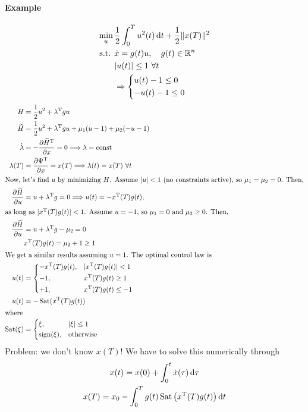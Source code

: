 \paragraph{Example} \mbox{}
\begin{align}
  \min_u {} & \frac12 \int_0^T u^2(t)\mathop{}\!\mathrm{d} t + \frac12 \Vert x(T)\Vert^2 \\
  \text{s.t. } & \dot x=g(t) u, \quad g(t)\in\mathbb{R}^n \\
            & |u(t)| \le 1 \ \forall t \\
            & \Rightarrow \begin{dcases}
              u(t) - 1 \le 0 \\
              -u(t) - 1 \le 0
            \end{dcases}
\end{align}
\begin{align}
  H &= \frac12 u^2 + \lambda^\text{T} gu \\
  \widetilde H &= \frac12 u^2 + \lambda^\text{T} gu + \mu_1(u-1) + \mu_2(-u-1) \\
  \dot\lambda &= -\frac{\partial \widetilde H^\text{T}}{\partial x} = 0 \Longrightarrow \lambda=\text{const} \\
  \lambda(T) &= \frac{\partial \Psi^\text{T}}{\partial x} = x(T) \Longrightarrow \lambda(t) = x(T) \ \forall t \\
               \shortintertext{Now, let's find $u$ by minimizing $H$. Assume $|u|<1$ (no constraints active), so $\mu_1=\mu_2=0$. Then,}
  \frac{\partial \widetilde H}{\partial u} &= u + \lambda^\text{T} g = 0 \Longrightarrow u(t) = -x^\text{T}(T) g(t), \\
  \shortintertext{as long as $|x^\text{T}(T)g(t)|<1$. Assume $u=-1$, so $\mu_1=0$ and $\mu_2\ge0$. Then,}
  \frac{\partial \widetilde H}{\partial u} &= u + \lambda^\text{T} g - \mu_2 = 0 \\
    & x^\text{T}(T) g(t) = \mu_2 + 1 \ge 1 \\
  \shortintertext{We get a similar results assuming $u=1$. The optimal control law is}
  u(t) &= \begin{dcases}
    -x^\text{T}(T)g(t), & |x^\text{T}(T)g(t)| < 1 \\
    -1, & x^\text{T}(T)g(t) \ge 1 \\
    +1, & x^\text{T}(T)g(t) \le -1
  \end{dcases} \\
  u(t) &= -\mathop\text{Sat}(x^\text{T}(T)g(t)) \\
  \shortintertext{where}
  \mathop\text{Sat}(\xi) &= \begin{dcases}
    \xi, & |\xi| \le 1 \\
    \operatorname{sign}(\xi), & \text{otherwise}
  \end{dcases}
\end{align}
Problem: we don't know $x(T)$! We have to solve this numerically through
\begin{gather}
  x(t) = x(0) + \int_0^t \dot x(\tau)\mathop{}\!\mathrm{d}\tau \\
  x(T) = x_0 - \int_0^T g(t) \mathop\text{Sat}\big(x^\text{T}(T)g(t)\big) \mathop{}\!\mathrm{d} t
\end{gather}

